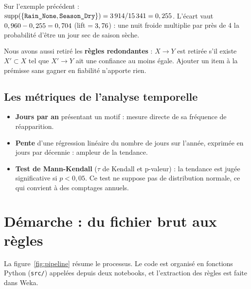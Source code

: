 \documentclass[12pt, a4paper]{article}
\newcommand{\itm}[1]{\texttt{#1}}
\begin{document}
Sur l'exemple précédent : $\operatorname{supp}(\{\itm{Rain\_None}, \itm{Season\_Dry}\}) =
\exNY / \Njours = \exSuppY$. L'écart vaut $0,960 - 0,255 = 0,704$ (lift $= 3,76$) :
une nuit froide multiplie par près de 4 la probabilité d'être un jour sec de saison sèche.

Nous avons aussi retiré les \textbf{règles redondantes} : $X \rightarrow Y$ est retirée s'il
existe $X' \subset X$ tel que $X' \rightarrow Y$ ait une confiance au moins égale. Ajouter un
item à la prémisse sans gagner en fiabilité n'apporte rien.

\subsection{Les métriques de l'analyse temporelle}

\begin{itemize}
  \item \textbf{Jours par an} présentant un motif : mesure directe de sa fréquence de
        réapparition.
  \item \textbf{Pente} d'une régression linéaire du nombre de jours sur l'année, exprimée en
        jours par décennie : ampleur de la tendance.
  \item \textbf{Test de Mann-Kendall} ($\tau$ de Kendall et p-valeur) : la tendance est jugée
        significative si $p < 0{,}05$. Ce test ne suppose pas de distribution normale, ce qui
        convient à des comptages annuels.
\end{itemize}

\section{Démarche : du fichier brut aux règles}
\label{sec:demarche}

La figure~\ref{fig:pipeline} résume le processus. Le code est organisé en fonctions Python
(\texttt{src/}) appelées depuis deux notebooks, et l'extraction des règles est faite dans Weka.
\end{document}
